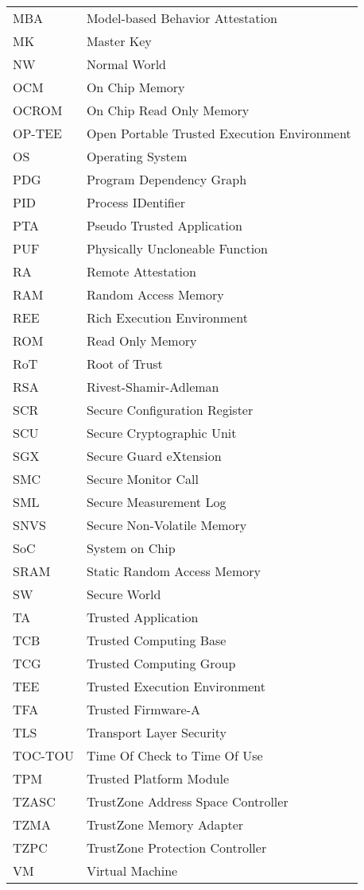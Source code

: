 \documentclass[master=cws,masteroption=vs,english]{kulemt}
\begin{document}
\begin{flushleft}
\begin{tabularx}{\textwidth}{@{}p{23mm}X@{}}
    	MBA		& Model-based Behavior Attestation \\
    	MK		& Master Key \\
    	NW		& Normal World \\
    	OCM		& On Chip Memory \\
    	OCROM	& On Chip Read Only Memory \\
    	OP-TEE	& Open Portable Trusted Execution Environment \\
    	OS		& Operating System \\
    	PDG		& Program Dependency Graph \\
    	PID		& Process IDentifier \\
    	PTA		& Pseudo Trusted Application \\
    	PUF		& Physically Uncloneable Function \\
    	RA		& Remote Attestation \\
    	RAM		& Random Access Memory \\
    	REE		& Rich Execution Environment \\
    	ROM		& Read Only Memory \\
    	RoT		& Root of Trust \\
    	RSA		& Rivest-Shamir-Adleman \\
    	SCR		& Secure Configuration Register \\
    	SCU		& Secure Cryptographic Unit \\
    	SGX		& Secure Guard eXtension \\
    	SMC		& Secure Monitor Call \\
    	SML		& Secure Measurement Log \\
    	SNVS		& Secure Non-Volatile Memory \\
  	SoC		& System on Chip \\
  	SRAM		& Static Random Access Memory \\
  	SW		& Secure World \\
  	TA		& Trusted Application \\
  	TCB		& Trusted Computing Base \\
  	TCG		& Trusted Computing Group \\
  	TEE   	& Trusted Execution Environment \\
  	TFA		& Trusted Firmware-A \\
  	TLS		& Transport Layer Security \\
  	TOC-TOU	& Time Of Check to Time Of Use \\
    TPM		& Trusted Platform Module \\
    	TZASC	& TrustZone Address Space Controller \\
    	TZMA		& TrustZone Memory Adapter \\
    	TZPC		& TrustZone Protection Controller \\
    	VM		& Virtual Machine \\
  \end{tabularx}
\end{flushleft}
\end{document}
